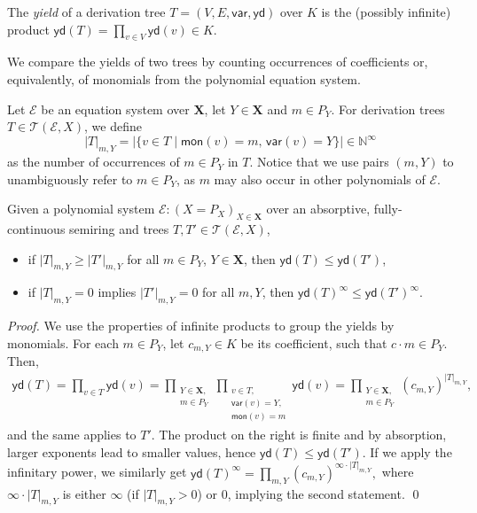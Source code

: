 \documentclass[english,runningheads,a4paper,envcountsame]{llncs}
\newenvironment{Definition}{\definition\upshape}{\enddefinition}
\newcommand{\Ninf}{{\mathbb N}^{\infty}}
\newcommand*{\XX}{{\bm X}}
\newcommand*{\EE}{\mathcal{E}}
\newcommand*{\yield}{\mathsf{yd}}
\newcommand*{\mon}{\mathsf{mon}}
\newcommand*{\var}{\mathsf{var}}
\newcommand*{\Trees}{\mathcal{T}}
\newcommand*{\moncount}[3]{|{#1}|_{#2,#3}}
\newcommand*{\co}{\colon}
\begin{document}
\begin{Definition}\label{defYield}
The \emph{yield} of a derivation tree $T = (V, E, \var, \yield)$ over $K$ is the (possibly infinite) product
$\yield(T) = \prod_{v \in V} \yield(v) \in K$.
\end{Definition}

We compare the yields of two trees by counting occurrences of coefficients or, equivalently, of monomials from the polynomial equation system.


\begin{Definition}
Let $\EE$ be an equation system over $\XX$, let $Y \in \XX$ and $m \in P_Y$.
For derivation trees $T \in \Trees(\EE, X)$, we define
\[
    \moncount T m Y = \big|\{ v \in T \mid \text{$\mon(v) = m$, $\var(v) = Y$}\} \big| \in \Ninf
\]
as the number of occurrences of $m \in P_Y$ in $T$.
Notice that we use pairs $(m,Y)$ to unambiguously refer to $m \in P_Y$, as $m$ may also occur in other polynomials of $\EE$.
\end{Definition}

\begin{lemma}\label{lemYieldComparison}
Given a polynomial system $\EE \co (X = P_X)_{X \in \XX}$ over an absorptive, fully-continuous semiring and trees $T,T' \in \Trees(\EE, X)$,
\begin{itemize}
\item if $\moncount T m Y \ge \moncount {T'} m Y$ for all $m \in P_Y$, $Y \in \XX$, then $\yield(T) \le \yield(T')$,
\item if $|T|_{m,Y} = 0$ implies $|T'|_{m,Y} = 0$ for all $m,Y$, then $\yield(T)^\infty \le \yield(T')^\infty$.
\end{itemize}
\end{lemma}
\begin{proof}
We use the properties of infinite products to group the yields by monomials.
For each $m \in P_Y$, let $c_{m,Y} \in K$ be its coefficient, such that $c \cdot m \in P_Y$. Then,
\begin{align*}
  \yield(T) =
  \prod_{v \in T} \yield(v) =
  \prod_{\substack{Y \in \XX, \\ m \in P_Y}} \prod_{\substack{v \in T,\\\var(v) = Y,\\\mon(v) = m}} \yield(v) =
  \prod_{\substack{Y \in \XX, \\ m \in P_Y}} (c_{m,Y})^{\moncount T m Y},
\end{align*}
and the same applies to $T'$.
The product on the right is finite and by absorption, larger exponents lead to smaller values,
hence $\yield(T) \le \yield(T')$.
%
If we apply the infinitary power, we similarly get
$
  \yield(T)^\infty =
  \prod_{m,Y} (c_{m,Y})^{\infty \cdot \moncount T m Y},
$
where $\infty \cdot \moncount T m Y$ is either $\infty$ (if $\moncount T m Y > 0$) or $0$, implying the second statement. \qed
\end{proof}
\end{document}
